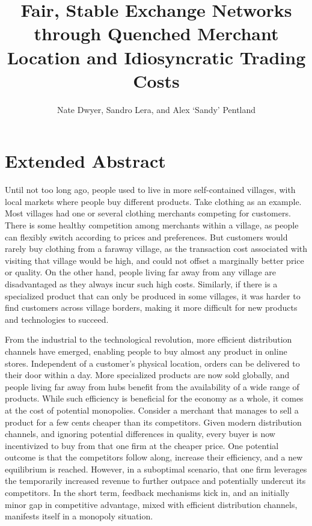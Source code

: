 \documentclass[11pt]{article}
\title{Fair, Stable Exchange Networks through Quenched Merchant Location and Idiosyncratic Trading Costs}
\author{Nate Dwyer, Sandro Lera, and Alex `Sandy' Pentland}
\begin{document}
\maketitle
\setcounter{section}{0}

\section*{Extended Abstract}

Until not too long ago, people used to live in more self-contained villages,
with local markets where people buy different products.  Take clothing as an
example. Most villages had one or several clothing merchants competing for
customers.  There is some healthy competition among merchants within a village,
as people can flexibly switch according to prices and preferences. But
customers would rarely buy clothing from a faraway village, as the transaction
cost associated with visiting that village would be high,  and could not offset
a marginally better price or quality.  On the other hand, people living far
away from any village are disadvantaged as they always incur such high costs.
Similarly, if there is a specialized product that can only be produced in some
villages, it was harder to find customers across village borders,  making it
more difficult for new products and technologies to succeed. 

From the industrial to the technological revolution, more efficient
distribution channels have emerged, enabling people to buy almost any product
in online stores.  Independent of a customer's physical location, orders can be
delivered to their door within a day.  More specialized products are now sold
globally, and people living far away from hubs benefit from the availability of
a wide range of products.  While such efficiency is beneficial for the economy
as a whole, it comes at the cost of potential monopolies.  Consider a merchant
that manages to sell a product for a few cents cheaper than its competitors. 
Given modern distribution channels, and ignoring potential differences in
quality, every buyer is now incentivized to buy from that one firm at the
cheaper price. One potential outcome is that the competitors follow along,
increase their efficiency, and a new equilibrium is reached.  However, in a
suboptimal scenario, that one firm leverages the temporarily increased revenue
to further outpace and potentially undercut its competitors.  In the short
term, feedback mechanisms kick in, and an initially minor gap in competitive
advantage, mixed with efficient distribution channels, manifests itself in a
monopoly situation. 
\end{document}
